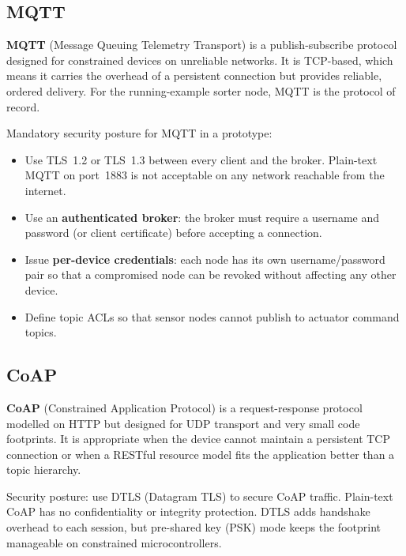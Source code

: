 \subsection{MQTT}
\label{sec:ch9-protocol-mqtt}

\textbf{MQTT} (Message Queuing Telemetry Transport) is a
publish-subscribe protocol designed for constrained devices on unreliable networks.
It is TCP-based, which means it carries the overhead of a persistent connection but
provides reliable, ordered delivery.
For the running-example sorter node, MQTT is the protocol of record.

Mandatory security posture for MQTT in a prototype:
\begin{itemize}
  \item Use TLS~1.2 or TLS~1.3 between every client and the broker.
        Plain-text MQTT on port~1883 is not acceptable on any network reachable
        from the internet.
  \item Use an \textbf{authenticated broker}: the
        broker must require a username and password (or client certificate) before
        accepting a connection.
  \item Issue \textbf{per-device credentials}:
        each node has its own username/password pair so that a compromised node
        can be revoked without affecting any other device.
  \item Define topic ACLs so that sensor nodes cannot publish to actuator command
        topics.
\end{itemize}

\subsection{CoAP}
\label{sec:ch9-protocol-coap}

\textbf{CoAP} (Constrained Application Protocol) is a
request-response protocol modelled on HTTP but designed for UDP transport and
very small code footprints.
It is appropriate when the device cannot maintain a persistent TCP connection or
when a RESTful resource model fits the application better than a topic hierarchy.

Security posture: use DTLS (Datagram TLS) to secure CoAP traffic.
Plain-text CoAP has no confidentiality or integrity protection.
DTLS adds handshake overhead to each session, but pre-shared key (PSK) mode keeps
the footprint manageable on constrained microcontrollers.


